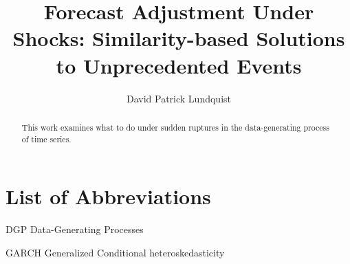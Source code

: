 \documentclass{uiucthesis2021}
\theoremstyle{definition}
\begin{document}
\title{Forecast Adjustment Under Shocks: Similarity-based Solutions to Unprecedented Events}
\author{David Patrick Lundquist}
\phdthesis
{}
\maketitle

\frontmatter

\begin{abstract}
This work examines what to do under sudden ruptures in the data-generating process of time series.
\end{abstract}




{
    \hypersetup{linkcolor=black}  %
    \tableofcontents
}

\chapter{List of Abbreviations}

\begin{abbrevlist}
\item[DGP] Data-Generating Processes
\item[GARCH] Generalized Conditional heteroskedasticity
\end{abbrevlist}


\end{document}
